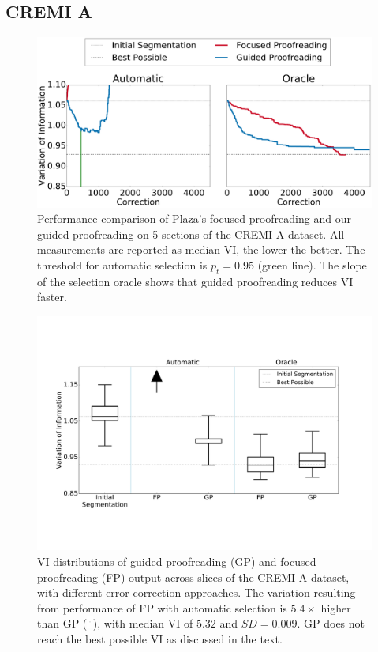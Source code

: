 \subsection{CREMI A}

\begin{figure}[t]
\centering
\includegraphics[width=\linewidth]{gfx/cremiA_trails.pdf}
\caption{Performance comparison of Plaza's focused proofreading and our guided proofreading on 5 sections of the CREMI A dataset. All measurements are reported as median VI, the lower the better. The threshold for automatic selection is $p_t=0.95$ (green line). The slope of the selection oracle shows that guided proofreading reduces VI faster.}
\label{fig:cremiAtrails}
\end{figure}

\begin{figure}[t]
\centering
\includegraphics[width=\linewidth]{gfx/cremiAboxplot.pdf}
\caption{VI distributions of guided proofreading (GP) and focused proofreading (FP) output across slices of the CREMI A dataset, with different error correction approaches. The variation resulting from performance of FP with automatic selection is $5.4\times$ higher than GP (\protect\includegraphics[width=0.2cm]{gfx/arrow.pdf}), with median VI of $5.32$ and $SD=0.009$. GP does not reach the best possible VI as discussed in the text.}
\label{fig:cremiAboxplot}
\end{figure}

